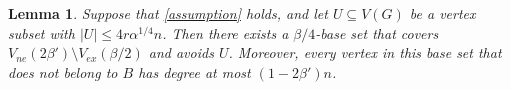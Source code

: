 \documentclass[11pt, a4paper]{article}
\newtheorem{lemma}[theorem]{Lemma}
\theoremstyle{definition}
\newcommand{\<}{\subseteq}
\begin{document}
\begin{lemma}\label{Vne}
Suppose that \ref{assumption} holds, and let  $U\subseteq V(G)$ be a vertex subset with $|U|\le 4r\alpha^{1/4} n$. %
Then there exists a $\beta/4$-base set that covers $V_{ne}(2\beta')\setminus V_{ex}(\beta/2)$ and avoids $U$. Moreover, every vertex in this base set that does not belong to $B$ has degree at most $ (1-2\beta')n$. %


\end{lemma}
\end{document}
